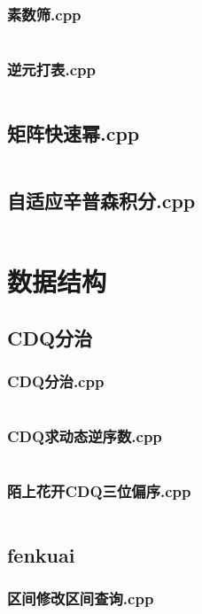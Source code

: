 \documentclass[a4paper,11pt]{article}
\begin{document}
\subsubsection{素数筛.cpp}
\inputminted[breaklines]{c++}{"D:/tmplz/templates/数学/数论/素数筛.cpp"}
\subsubsection{逆元打表.cpp}
\inputminted[breaklines]{c++}{"D:/tmplz/templates/数学/数论/逆元打表.cpp"}
\subsection{矩阵快速幂.cpp}
\inputminted[breaklines]{c++}{"D:/tmplz/templates/数学/矩阵快速幂.cpp"}
\subsection{自适应辛普森积分.cpp}
\inputminted[breaklines]{c++}{"D:/tmplz/templates/数学/自适应辛普森积分.cpp"}
\section{数据结构}
\subsection{CDQ分治}
\subsubsection{CDQ分治.cpp}
\inputminted[breaklines]{c++}{"D:/tmplz/templates/数据结构/CDQ分治/CDQ分治.cpp"}
\subsubsection{CDQ求动态逆序数.cpp}
\inputminted[breaklines]{c++}{"D:/tmplz/templates/数据结构/CDQ分治/CDQ求动态逆序数.cpp"}
\subsubsection{陌上花开CDQ三位偏序.cpp}
\inputminted[breaklines]{c++}{"D:/tmplz/templates/数据结构/CDQ分治/陌上花开CDQ三位偏序.cpp"}
\subsection{fenkuai}
\subsubsection{区间修改区间查询.cpp}
\inputminted[breaklines]{c++}{"D:/tmplz/templates/数据结构/fenkuai/区间修改区间查询.cpp"}
\end{document}
